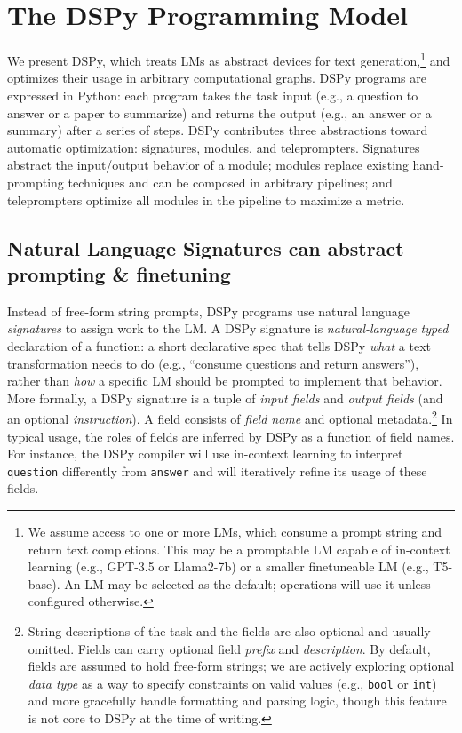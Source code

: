 \section{The DSPy Programming Model}\label{sec:dspy_programming_model}


We present DSPy, which treats LMs as abstract devices for text generation,\footnote{We assume access to one or more LMs, which consume a prompt string and return text completions. This may be a promptable LM capable of in-context learning (e.g., GPT-3.5 or Llama2-7b) or a smaller finetuneable LM (e.g., T5-base). An LM may be selected as the default; operations will use it unless configured otherwise.} and optimizes their usage in arbitrary computational graphs. DSPy programs are expressed in Python: each program takes the task input (e.g., a question to answer or a paper to summarize) and returns the output (e.g., an answer or a summary) after a series of steps. DSPy contributes three abstractions toward automatic optimization: signatures, modules, and teleprompters. Signatures abstract the input/output behavior of a module; modules replace existing hand-prompting techniques and can be composed in arbitrary pipelines; and teleprompters optimize all modules in the pipeline to maximize a metric. %






\subsection{Natural Language Signatures can abstract prompting \& finetuning}\label{sec:signatures}

Instead of free-form string prompts, DSPy programs use natural language \textit{signatures} to assign work to the LM. A DSPy signature is \textit{natural-language typed} declaration of a function: a short declarative spec that tells DSPy \textit{what} a text transformation needs to do (e.g., ``consume questions and return answers''), rather than \textit{how} a specific LM should be prompted to implement that behavior.
More formally, a DSPy signature is a tuple of \textit{input fields} and \textit{output fields} (and an optional \textit{instruction}). A field consists of \textit{field name} and optional metadata.\footnote{String descriptions of the task and the fields are also optional and usually omitted. Fields can carry optional field \textit{prefix} and \textit{description}. By default, fields are assumed to hold free-form strings; we are actively exploring optional \textit{data type} as a way to specify constraints on valid values (e.g., \texttt{bool} or \texttt{int}) and more gracefully handle formatting and parsing logic, though this feature is not core to DSPy at the time of writing.}
In typical usage, the roles of fields are inferred by DSPy as a function of field names. For instance, the DSPy compiler will use in-context learning to interpret \texttt{question} differently from \texttt{answer} and will iteratively refine its usage of these fields.

